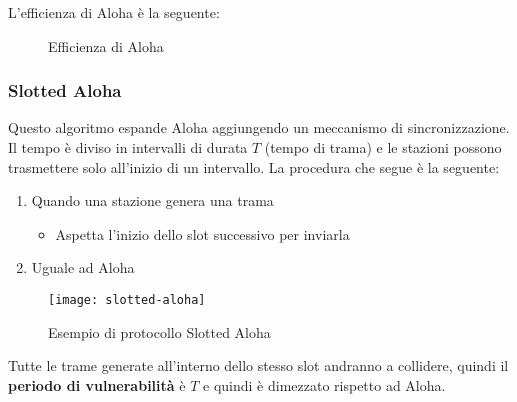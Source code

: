 \documentclass[a4paper]{article}
\begin{document}
\vspace{1em}
\noindent
L'efficienza di Aloha è la seguente:
\begin{figure}[H]
  \centering
  \caption{Efficienza di Aloha}
\end{figure}

\subsubsection{Slotted Aloha}
Questo algoritmo espande Aloha aggiungendo un meccanismo di sincronizzazione. Il
tempo è diviso in intervalli di durata \( T \) (tempo di trama) e le stazioni
possono trasmettere solo all'inizio di un intervallo. La procedura che segue è la
seguente:
\begin{enumerate}
  \item Quando una stazione genera una trama
    \begin{itemize}
      \item Aspetta l'inizio dello slot successivo per inviarla
    \end{itemize}
  \item Uguale ad Aloha
\end{enumerate}

\vspace{1em}
\noindent
\begin{figure}[H]
  \centering
  \texttt{[image: slotted-aloha]}
  \caption{Esempio di protocollo Slotted Aloha}
\end{figure}
Tutte le trame generate all'interno dello stesso slot andranno a collidere, quindi
il \textbf{periodo di vulnerabilità} è \( T \) e quindi è dimezzato rispetto ad Aloha.
\end{document}
